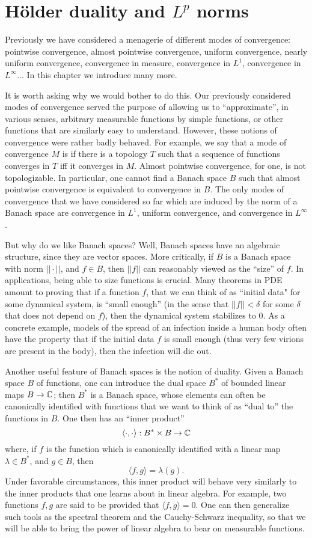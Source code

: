 \chapter{H\"older duality and $L^p$ norms}
Previously we have considered a menagerie of different modes of convergence: pointwise convergence, almost pointwise convergence, uniform convergence, nearly uniform convergence, convergence in measure, convergence in $L^1$, convergence in $L^\infty$...
In this chapter we introduce many more.

It is worth asking why we would bother to do this.
Our previously considered modes of convergence served the purpose of allowing us to ``approximate'', in various senses, arbitrary measurable functions by simple functions, or other functions that are similarly easy to understand.
However, these notions of convergence were rather badly behaved.
For example, we say that a mode of convergence $M$ is  if there is a topology $T$ such that a sequence of functions converges in $T$ iff it converges in $M$.
Almost pointwise convergence, for one, is not topologizable.
In particular, one cannot find a Banach space $B$ such that almost pointwise convergence is equivalent to convergence in $B$.
The only modes of convergence that we have considered so far which are induced by the norm of a Banach space are convergence in $L^1$, uniform convergence, and convergence in $L^\infty$.

But why do we like Banach spaces? Well, Banach spaces have an algebraic structure, since they are vector spaces.
More critically, if $B$ is a Banach space with norm $||\cdot||$, and $f \in B$, then $||f||$ can reasonably viewed as the ``size'' of $f$.
In applications, being able to size functions is crucial.
Many theorems in PDE amount to proving that if a function $f$, that we can think of as ``initial data" for some dynamical system, is ``small enough'' (in the sense that $||f|| < \delta$ for some $\delta$ that does not depend on $f$), then the dynamical system stabilizes to $0$.
As a concrete example, models of the spread of an infection inside a human body often have the property that if the initial data $f$ is small enough (thus very few virions are present in the body), then the infection will die out.

Another useful feature of Banach spaces is the notion of duality.
Given a Banach space $B$ of functions, one can introduce the dual space $B^*$ of bounded linear maps $B \to \mathbb{C}$; then $B^*$ is a Banach space, whose elements can often be canonically identified with functions that we want to think of as ``dual to'' the functions in $B$.
One then has an ``inner product''
\[\langle \cdot, \cdot\rangle: B^* \times B \to \mathbb{C}\]
where, if $f$ is the function which is canonically identified with a linear map $\lambda \in B^*$, and $g \in B$, then
\[\langle f, g\rangle = \lambda(g).\]
Under favorable circumstances, this inner product will behave very similarly to the inner products that one learns about in linear algebra.
For example, two functions $f, g$ are said to be  provided that $\langle f, g\rangle = 0$.
One can then generalize such tools as the spectral theorem and the Cauchy-Schwarz inequality, so that we will be able to bring the power of linear algebra to bear on measurable functions.

